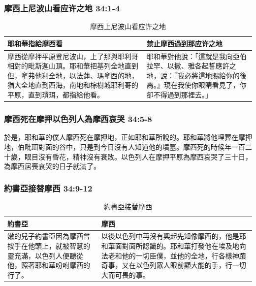 \subsubsection{摩西上尼波山看应许之地 34:1-4}
\begin{table}[H]
\begin{tabular}{ p{}|p{}} \toprule
耶和華指給摩西看&禁止摩西過到那应许之地          \\\hline
摩西從摩押平原登尼波山，上了那與耶利哥相對的毗斯迦山頂。耶和華把基列全地直到但，拿弗他利全地，以法蓮、瑪拿西的地，猶大全地直到西海，南地和棕樹城耶利哥的平原，直到瑣珥，都指給他看。 &耶和華對他說：「這就是我向亞伯拉罕、以撒、雅各起誓應許之地，說：『我必將這地賜給你的後裔。』現在我使你眼睛看見了，你卻不得過到那裡去。」\\\hline
\bottomrule
\end{tabular}
\caption{摩西上尼波山看应许之地}
\label{table:sci}
\end{table}

\newpage
\subsubsection{摩西死在摩押以色列人為摩西哀哭 34:5-8}
於是，耶和華的僕人摩西死在摩押地，正如耶和華所說的。耶和華將他埋葬在摩押地，伯毗珥對面的谷中，只是到今日沒有人知道他的墳墓。摩西死的時候年一百二十歲，眼目沒有昏花，精神沒有衰敗。以色列人在摩押平原為摩西哀哭了三十日，為摩西居喪哀哭的日子就滿了。

\subsubsection{約書亞接替摩西 34:9-12}

\begin{table}[H]
\begin{tabular}{ p{}|p{}} \toprule
約書亞&摩西          \\\hline
嫩的兒子約書亞因為摩西曾按手在他頭上，就被智慧的靈充滿，以色列人便聽從他，照著耶和華吩咐摩西的行了。 &以後以色列中再沒有興起先知像摩西的，他是耶和華面對面所認識的。耶和華打發他在埃及地向法老和他的一切臣僕，並他的全地，行各樣神蹟奇事，又在以色列眾人眼前顯大能的手，行一切大而可畏的事。\\\hline
\bottomrule
\end{tabular}
\caption{約書亞接替摩西}
\label{table:sci}
\end{table}
 



